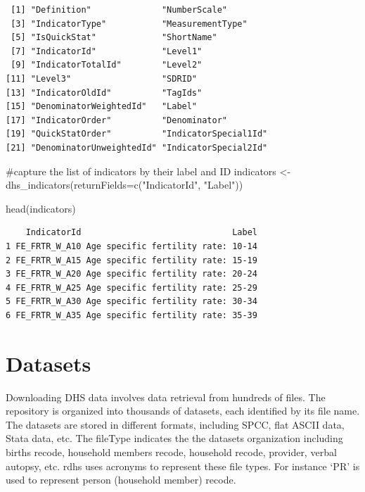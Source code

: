 \documentclass[
  letterpaper,
  DIV=11,
  numbers=noendperiod]{scrreprt}
\newenvironment{Shaded}{\begin{snugshade}}{\end{snugshade}}
\newcommand{\AttributeTok}[1]{\textcolor[rgb]{0.40,0.45,0.13}{#1}}
\newcommand{\CommentTok}[1]{\textcolor[rgb]{0.37,0.37,0.37}{#1}}
\newcommand{\FunctionTok}[1]{\textcolor[rgb]{0.28,0.35,0.67}{#1}}
\newcommand{\NormalTok}[1]{\textcolor[rgb]{0.00,0.23,0.31}{#1}}
\newcommand{\OtherTok}[1]{\textcolor[rgb]{0.00,0.23,0.31}{#1}}
\newcommand{\StringTok}[1]{\textcolor[rgb]{0.13,0.47,0.30}{#1}}
\begin{document}
\begin{verbatim}
 [1] "Definition"              "NumberScale"            
 [3] "IndicatorType"           "MeasurementType"        
 [5] "IsQuickStat"             "ShortName"              
 [7] "IndicatorId"             "Level1"                 
 [9] "IndicatorTotalId"        "Level2"                 
[11] "Level3"                  "SDRID"                  
[13] "IndicatorOldId"          "TagIds"                 
[15] "DenominatorWeightedId"   "Label"                  
[17] "IndicatorOrder"          "Denominator"            
[19] "QuickStatOrder"          "IndicatorSpecial1Id"    
[21] "DenominatorUnweightedId" "IndicatorSpecial2Id"    
\end{verbatim}

\begin{Shaded}
\begin{Highlighting}[]
\CommentTok{\#capture the list of indicators by their label and ID}
\NormalTok{indicators }\OtherTok{\textless{}{-}} \FunctionTok{dhs\_indicators}\NormalTok{(}\AttributeTok{returnFields=}\FunctionTok{c}\NormalTok{(}\StringTok{"IndicatorId"}\NormalTok{, }\StringTok{"Label"}\NormalTok{))}

\FunctionTok{head}\NormalTok{(indicators)}
\end{Highlighting}
\end{Shaded}

\begin{verbatim}
    IndicatorId                              Label
1 FE_FRTR_W_A10 Age specific fertility rate: 10-14
2 FE_FRTR_W_A15 Age specific fertility rate: 15-19
3 FE_FRTR_W_A20 Age specific fertility rate: 20-24
4 FE_FRTR_W_A25 Age specific fertility rate: 25-29
5 FE_FRTR_W_A30 Age specific fertility rate: 30-34
6 FE_FRTR_W_A35 Age specific fertility rate: 35-39
\end{verbatim}

\section{Datasets}\label{datasets}

Downloading DHS data involves data retrieval from hundreds of files. The
repository is organized into thousands of datasets, each identified by
its file name. The datasets are stored in different formats, including
SPCC, flat ASCII data, Stata data, etc. The fileType indicates the the
datasets organization including births recode, household members recode,
household recode, provider, verbal autopsy, etc. rdhs uses acronyms to
represent these file types. For instance `PR' is used to represent
person (household member) recode.
\end{document}
